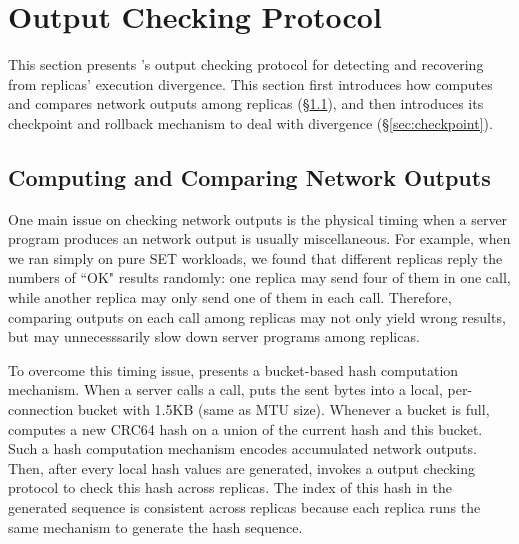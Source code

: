 \section{Output Checking Protocol} \label{sec:output}

This section presents \xxx's output checking protocol for detecting and 
recovering from replicas' execution divergence. This section first introduces 
how \xxx computes and compares network outputs among replicas 
(\S\ref{sec:output-workflow}), and then introduces its checkpoint and rollback 
mechanism to deal with divergence (\S\ref{sec:checkpoint}).

\subsection{Computing and Comparing Network Outputs} \label{sec:output-workflow}

One main issue on checking network outputs is the physical timing when a 
server program produces an network output is usually miscellaneous. For 
example, when we ran \redis simply on pure SET workloads, we found that 
different replicas reply the numbers of ``OK" results randomly: one replica may 
send four of them in one \send call, while another replica may only send one of 
them in each \send call. Therefore, comparing outputs on each \send call among 
replicas may not only yield wrong results, but may unnecesssarily slow down 
server programs among replicas.

To overcome this timing issue, \xxx presents a bucket-based hash computation 
mechanism. When a server calls a \send call, \xxx puts the sent bytes into a 
local, per-connection bucket with 1.5KB (same as MTU size). Whenever a bucket 
is full, \xxx computes a new CRC64 hash on a union of the current hash and this 
bucket. Such a hash computation mechanism encodes accumulated network outputs. 
Then, after every \thashcomp local hash values are generated, \xxx invokes a 
output checking protocol to check this hash across replicas. The index of 
this hash in the generated sequence is consistent across replicas because each 
replica runs the same mechanism to generate the hash sequence.


